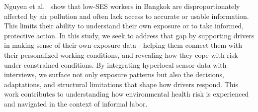Nguyen et al.~\cite{nguyen2023bangkokpollution} show that low-SES workers in Bangkok are disproportionately affected by air pollution and often lack access to accurate or usable information. 
This limits their ability to understand their own exposure or to take informed, protective action. 
In this study, we seek to address that gap by supporting drivers in making sense of their own exposure data - helping them connect them with their personalized working conditions, and revealing how they cope with risk under constrained conditions. 
By integrating hyperlocal sensor data with interviews, we surface not only exposure patterns but also the decisions, adaptations, and structural limitations that shape how drivers respond. 
This work contributes to understanding how environmental health risk is experienced and navigated in the context of informal labor.








